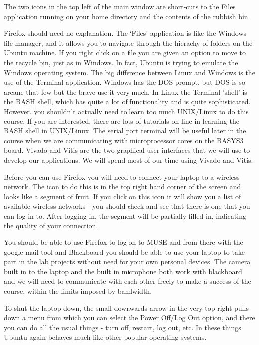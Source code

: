 \documentclass[../physical_computing.tex]{subfiles}
\begin{document}
The two icons in the top left of the main window are short-cuts to the Files application running on your home directory and the contents of the rubbish bin

Firefox should need no explanation. The `Files' application is like the Windows file manager, and it allows you to navigate through the hierachy of folders on the Ubuntu machine. If you right click on a file you are given an option to move to the recycle bin, just as in Windows. In fact, Ubuntu is trying to emulate the Windows operating system. The big difference between Linux and Windows is the use of the Terminal application. Windows has the DOS prompt, but DOS is so arcane that few but the brave use it very much. In Linux the Terminal 'shell' is the BASH shell, which has quite a lot of functionality and is quite sophisticated. However, you shouldn't actually need to learn too much UNIX/Linux to do this course. If you are interested, there are lots of tutorials on line in learning the BASH shell in UNIX/Linux. The serial port terminal will be useful later in the course when we are communicating with microprocessor cores on the BASYS3 board. Vivado and Vitis are the two graphical user interfaces that we will use to develop our applications. We will spend most of our time using Vivado and Vitis.

Before you can use Firefox you will need to connect your laptop to a wireless network. The icon to do this is in the top right hand corner of the screen and looks like a segment of fruit. If you click on this icon it will show you a list of available wireless networks - you should check and see that there is one that you can log in to. After logging in, the segment will be partially filled in, indicating the quality of your connection.

You should be able to use Firefox to log on to MUSE and from there with the google mail tool and Blackboard you should be able to use your laptop to take part in the lab projects without need for your own personal devices. The camera built in to the laptop and the built in microphone both work with blackboard and we will need to communicate with each other freely to make a success of the course, within the limits imposed by bandwidth.

To shut the laptop down, the small downwards arrow in the very top right pulls down a menu from which you can select the Power Off/Log Out option, and there you can do all the usual things - turn off, restart, log out, etc. In these things Ubuntu again behaves much like other popular operating systems.
\end{document}
